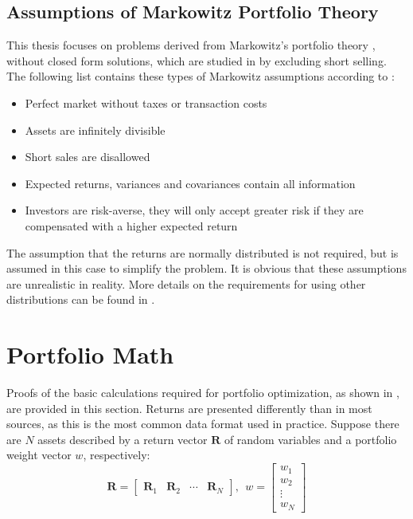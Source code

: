 \documentclass[
  oneside]{book}
\providecommand{\tightlist}{%
  \setlength{\itemsep}{0pt}\setlength{\parskip}{0pt}}
\begin{document}
\hypertarget{assumptions-of-markowitz-portfolio-theory}{%
\subsection{Assumptions of Markowitz Portfolio Theory}\label{assumptions-of-markowitz-portfolio-theory}}

This thesis focuses on problems derived from Markowitz's portfolio theory \citep{Mark1959}, without closed form solutions, which are studied in \citep{Mari2005} by excluding short selling. The following list contains these types of Markowitz assumptions according to \citep{Mari2005}:

\vspace{-0.4cm}

\begin{itemize}
\tightlist
\item
  Perfect market without taxes or transaction costs
\item
  Assets are infinitely divisible
\item
  Short sales are disallowed
\item
  Expected returns, variances and covariances contain all information
\item
  Investors are risk-averse, they will only accept greater risk if they
  are compensated with a higher expected return
\end{itemize}

The assumption that the returns are normally distributed is not required, but is assumed in this case to simplify the problem. It is obvious that these assumptions are unrealistic in reality. More details on the requirements for using other distributions can be found in \citep{Mari2005}.

\hypertarget{portfolio-math}{%
\section{Portfolio Math}\label{portfolio-math}}

Proofs of the basic calculations required for portfolio optimization, as shown in \citep{Eric2021}, are provided in this section. Returns are presented differently than in most sources, as this is the most common data format used in practice. Suppose there are \(N\) assets described by a return vector \(\pmb{R}\) of random variables and a portfolio weight vector \(w\), respectively:
\[
  \pmb{R} = 
  \begin{bmatrix}
    \pmb{R}_{1} & \pmb{R}_{2} & \cdots & \pmb{R}_{N}  
 \end{bmatrix}
 , \ \ 
 w = 
  \begin{bmatrix}
    w_{1} \\ 
    w_{2} \\
    \vdots \\
    w_{N}  
 \end{bmatrix}
\]
\end{document}

